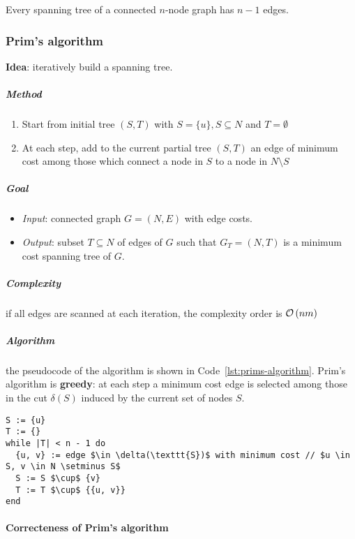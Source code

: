 \documentclass[english]{article}
\begin{document}
\begin{property}
  Every spanning tree of a connected \(n\)-node graph has \(n-1\) edges.
\end{property}

\subsubsection{Prim's algorithm}

\textbf{Idea}: iteratively build a spanning tree.

\subparagraph*{Method}
\begin{enumerate}
  \item Start from initial tree \((S, T)\) with \(S = \{u\}, S \subseteq N\) and \(T = \emptyset\)
  \item At each step, add to the current partial tree \((S, T)\) an edge of minimum cost among those which connect a node in \(S\) to a node in \(N \setminus S\)
\end{enumerate}

\subparagraph*{Goal}
\begin{itemize}[label=\(\rightarrow\)]
  \item \textit{Input}: connected graph \(G = (N, E)\) with edge costs.
  \item \textit{Output}: subset \(T \subseteq N\) of edges of \(G\) such that \(G_T = (N, T)\) is a minimum cost spanning tree of \(G\).
\end{itemize}

\subparagraph*{Complexity}
if all edges are scanned at each iteration, the complexity order is \(\mathcal{O}\left(nm\right)\)

\subparagraph*{Algorithm}
the pseudocode of the algorithm is shown in Code~\ref{lst:prims-algorithm}.
Prim's algorithm is \textbf{greedy}:
at each step a minimum cost edge is selected among those in the cut \(\delta(S)\) induced by the current set of nodes \(S\).

\begin{lstlisting}[caption={Prim's algorithm}, label={lst:prims-algorithm}, float]
S := {u}
T := {}
while |T| < n - 1 do
  {u, v} := edge $\in \delta(\texttt{S})$ with minimum cost // $u \in S, v \in N \setminus S$
  S := S $\cup$ {v}
  T := T $\cup$ {{u, v}}
end
\end{lstlisting}

\paragraph{Correcteness of Prim's algorithm}
\end{document}

